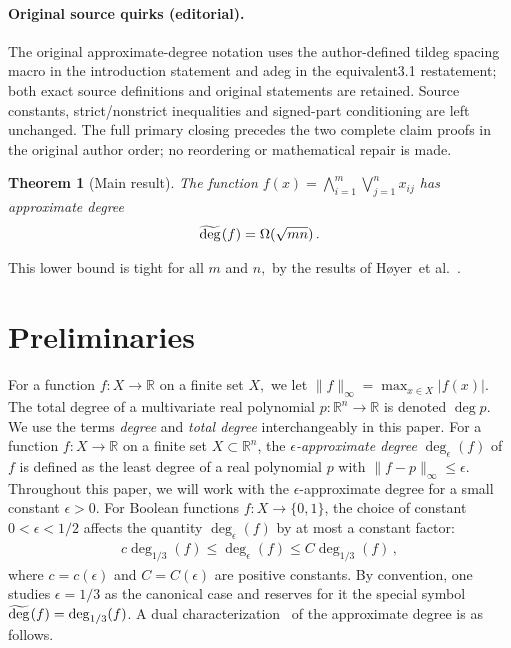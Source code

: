 \documentclass[10pt]{article}
\newtheorem{theorem}{Theorem}[section]
\theoremstyle{definition}
\numberwithin{equation}{section}
\newcommand{\R}{{\mathbb R}}
\newcommand{\adeg}{\deg_{1/3}}
\newcommand{\degeps}{\deg_\epsilon}
\newcommand{\1}{\mathbf{1}}
\newcommand{\zoo}{\{0,1\}}
\newcommand{\tildeg}{\deg\hspace{-18pt}\widetilde{\rule{0mm}{6pt}\hspace{6mm}}}
\begin{document}
\paragraph{Original source quirks (editorial).} The original approximate-degree notation uses the author-defined tildeg spacing macro in the introduction statement and adeg in the equivalent3.1 restatement; both exact source definitions and original statements are retained. Source constants, strict/nonstrict inequalities and signed-part conditioning are left unchanged. The full primary closing precedes the two complete claim proofs in the original author order; no reordering or mathematical repair is made.
\endgroup
\clearpage
\setcounter{section}{1}\setcounter{theorem}{0}
\begin{theorem}[Main result]
The function $f(x)=\bigwedge_{i=1}^m\bigvee_{j=1}^nx_{ij}$ has
approximate degree
\begin{align*}
\tildeg(f)=\Omega(\sqrt{mn})\,.
\end{align*}
%
\end{theorem}

This lower bound is tight for all $m$ and $n,$
by the results of H\o yer~et al.~\cite{hoyer-mosca-dewolf03and-or-tree}. 
\setcounter{section}{1}
\section{Preliminaries}
 
For a function $f\colon X\to\R$ on a finite set 
$X,$ we let $\|f\|_{\infty}=\max_{x\in X}|f(x)|$.
The total degree of a multivariate real polynomial $p\colon\R^n\to\R$
is denoted $\deg p$. We use the terms \emph{degree} and \emph{total
degree} interchangeably in this paper. For a function $f\colon X\to\R$
on a finite set $X\subset\R^n$, the \emph{$\epsilon$-approximate
degree} $\degeps(f)$ of $f$ is defined as the least degree of a
real polynomial $p$ with $\|f-p\|_{\infty}\leq\epsilon$. Throughout
this paper, we will work with the $\epsilon$-approximate degree for
a small constant $\epsilon>0$. For Boolean functions $f\colon X\to\zoo$,
the choice of constant $0<\epsilon<1/2$ affects the quantity $\degeps(f)$
by at most a constant factor:
\begin{align}
c\adeg(f)\leq\degeps(f)\leq C\adeg(f)\,,\label{eq:error-boosting}
\end{align}
where $c=c(\epsilon)$ and $C=C(\epsilon)$ are positive constants.
By convention, one studies $\epsilon=1/3$ as the canonical case and
reserves for it the special symbol $\tildeg(f)=\adeg(f)$. A dual
characterization~\cite{sherstov07quantum,sherstov11quantum-sdpt}
of the approximate degree is as follows.
\end{document}
